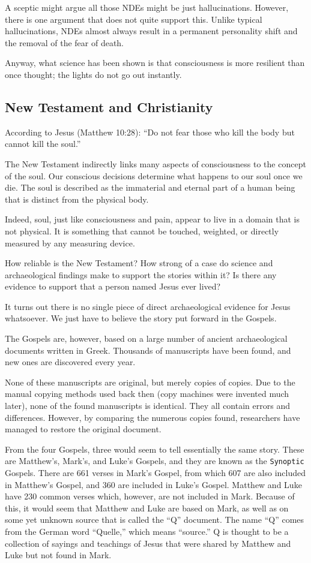 A sceptic might argue all those NDEs might be just hallucinations. However, there is one argument
that does not quite support this. Unlike typical hallucinations, NDEs almost always result in a permanent personality shift and the removal of the fear of death.

Anyway, what science has been shown is that consciousness is more resilient than once thought; the lights do not go out instantly.



\subsection*{New Testament and Christianity}

According to Jesus (Matthew 10:28):
``Do not fear those who kill the body but cannot kill the soul.''

The New Testament indirectly links many aspects of consciousness
to the concept of the soul. Our conscious decisions determine
what happens to our soul once we die. The soul is described as the
immaterial and eternal part of a human being that is distinct from
the physical body.

Indeed, soul, just like consciousness and pain, appear to live in a domain
that is not physical. It is something that cannot be touched, weighted,
or directly measured by any measuring device.

How reliable is the New Testament? How strong of a case do
science and archaeological findings make to support the stories
within it? Is there any evidence to support that a person named
Jesus ever lived?

It turns out there is no single piece of direct archaeological
evidence for Jesus whatsoever. We just have to believe the story
put forward in the Gospels.

The Gospels are, however, based on a large number of ancient
archaeological documents written in Greek. Thousands of manuscripts
have been found, and new ones are discovered every year.

None of these manuscripts are original, but merely copies of
copies. Due to the manual copying methods used back then (copy
machines were invented much later), none of the found manuscripts
is identical. They all contain errors and differences.
However, by comparing the numerous copies found, researchers have
managed to restore the original document.

From the four Gospels, three would seem to tell essentially the
same story. These are Matthew's, Mark's, and Luke's Gospels, and
they are known as the \texttt{Synoptic} Gospels. There are 661
verses in Mark's Gospel, from which 607 are also included in
Matthew's Gospel, and 360 are included in Luke's Gospel. Matthew
and Luke have 230 common verses which, however, are not included
in Mark. Because of this, it would seem that Matthew and Luke are
based on Mark, as well as on some yet unknown source that is
called the ``Q'' document. The name ``Q'' comes from the German
word ``Quelle,'' which means ``source.'' Q is thought to be a
collection of sayings and teachings of Jesus that were shared by
Matthew and Luke but not found in Mark.

